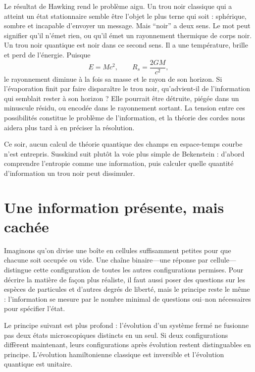 Le résultat de Hawking rend le problème aigu. Un trou noir classique qui a atteint un état stationnaire semble être l’objet le plus terne qui soit : sphérique, sombre et incapable d’envoyer un message. Mais ``noir'' a deux sens. Le mot peut signifier qu’il n’émet rien, ou qu’il émet un rayonnement thermique de corps noir. Un trou noir quantique est noir dans ce second sens. Il a une température, brille et perd de l’énergie. Puisque
\begin{equation}
E=Mc^2,
\qquad
R_s=\frac{2GM}{c^2},
\end{equation}
le rayonnement diminue à la fois sa masse et le rayon de son horizon. Si l’évaporation finit par faire disparaître le trou noir, qu’advient-il de l’information qui semblait rester à son horizon ? Elle pourrait être détruite, piégée dans un minuscule résidu, ou encodée dans le rayonnement sortant. La tension entre ces possibilités constitue le problème de l’information, et la théorie des cordes nous aidera plus tard à en préciser la résolution.

Ce soir, aucun calcul de théorie quantique des champs en espace-temps courbe n’est entrepris. Susskind suit plutôt la voie plus simple de Bekenstein : d’abord comprendre l’entropie comme une information, puis calculer quelle quantité d’information un trou noir peut dissimuler.

\section{Une information présente, mais cachée}

Imaginons qu’on divise une boîte en cellules suffisamment petites pour que chacune soit occupée ou vide. Une chaîne binaire---une réponse par cellule---distingue cette configuration de toutes les autres configurations permises. Pour décrire la matière de façon plus réaliste, il faut aussi poser des questions sur les espèces de particules et d’autres degrés de liberté, mais le principe reste le même : l’information se mesure par le nombre minimal de questions oui--non nécessaires pour spécifier l’état.

\begin{classroomqa}
\end{classroomqa}

Le principe suivant est plus profond : l’évolution d’un système fermé ne fusionne pas deux états microscopiques distincts en un seul. Si deux configurations diffèrent maintenant, leurs configurations après évolution restent distinguables en principe. L’évolution hamiltonienne classique est inversible et l’évolution quantique est unitaire.

